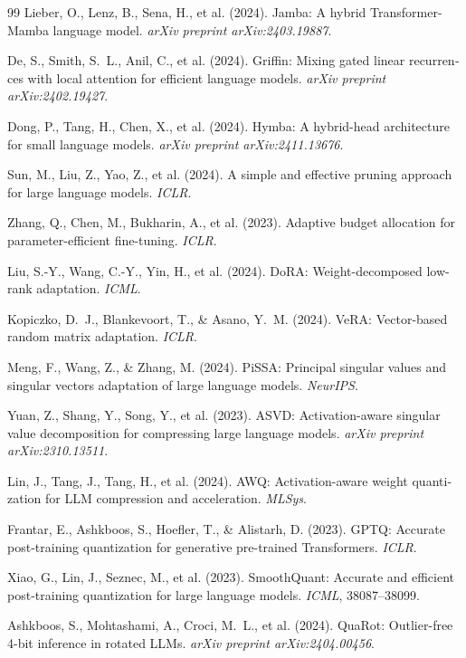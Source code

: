 \documentclass[12pt,a4paper]{report}
\theoremstyle{definition}
\begin{document}
\begin{latin}
\begin{thebibliography}{99}
Lieber, O., Lenz, B., Sena, H., et al. (2024).
Jamba: A hybrid Transformer-Mamba language model.
\textit{arXiv preprint arXiv:2403.19887}.

De, S., Smith, S.~L., Anil, C., et al. (2024).
Griffin: Mixing gated linear recurrences with local attention for efficient language models.
\textit{arXiv preprint arXiv:2402.19427}.

Dong, P., Tang, H., Chen, X., et al. (2024).
Hymba: A hybrid-head architecture for small language models.
\textit{arXiv preprint arXiv:2411.13676}.

Sun, M., Liu, Z., Yao, Z., et al. (2024).
A simple and effective pruning approach for large language models.
\textit{ICLR}.

Zhang, Q., Chen, M., Bukharin, A., et al. (2023).
Adaptive budget allocation for parameter-efficient fine-tuning.
\textit{ICLR}.

Liu, S.-Y., Wang, C.-Y., Yin, H., et al. (2024).
DoRA: Weight-decomposed low-rank adaptation.
\textit{ICML}.

Kopiczko, D.~J., Blankevoort, T., \& Asano, Y.~M. (2024).
VeRA: Vector-based random matrix adaptation.
\textit{ICLR}.

Meng, F., Wang, Z., \& Zhang, M. (2024).
PiSSA: Principal singular values and singular vectors adaptation of large language models.
\textit{NeurIPS}.

Yuan, Z., Shang, Y., Song, Y., et al. (2023).
ASVD: Activation-aware singular value decomposition for compressing large language models.
\textit{arXiv preprint arXiv:2310.13511}.

Lin, J., Tang, J., Tang, H., et al. (2024).
AWQ: Activation-aware weight quantization for LLM compression and acceleration.
\textit{MLSys}.

Frantar, E., Ashkboos, S., Hoefler, T., \& Alistarh, D. (2023).
GPTQ: Accurate post-training quantization for generative pre-trained Transformers.
\textit{ICLR}.

Xiao, G., Lin, J., Seznec, M., et al. (2023).
SmoothQuant: Accurate and efficient post-training quantization for large language models.
\textit{ICML}, 38087--38099.

Ashkboos, S., Mohtashami, A., Croci, M.~L., et al. (2024).
QuaRot: Outlier-free 4-bit inference in rotated LLMs.
\textit{arXiv preprint arXiv:2404.00456}.


\end{thebibliography}
\end{latin}
\end{document}

